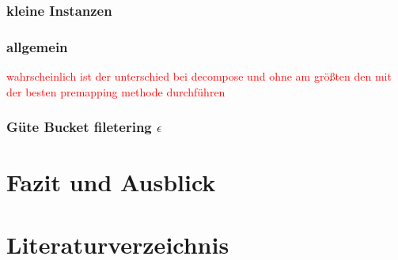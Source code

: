 \documentclass[11pt, a4paper, german]{article}
\begin{document}
\subsubsection{kleine Instanzen}

\subsubsection{allgemein}
\textcolor{red}{wahrscheinlich ist der unterschied bei decompose und ohne am größten den mit der besten premapping methode durchführen}

\subsubsection{Güte Bucket filetering $\epsilon$ }

\section{Fazit und Ausblick}
\label{sec:fazit_und_ausblick}
	

\section{Literaturverzeichnis}
\nocite{*}



\end{document}
